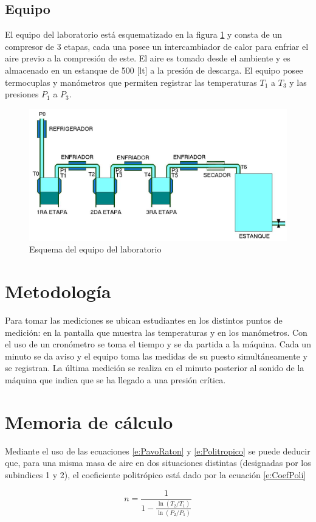 \documentclass[11pt,letterpaper]{extarticle}        %
\numberwithin{equation}{section}                    %
\begin{document}
\subsection{Equipo}
El equipo del laboratorio está esquematizado en la figura \ref{f:Equipo} y consta de un compresor de 3 etapas, cada una posee un intercambiador de calor para enfriar el aire previo a la compresión de este. El aire es tomado desde el ambiente y es almacenado en un estanque de 500 [lt] a la presión de descarga. El equipo posee termocuplas y manómetros que permiten registrar las temperaturas $T_1$ a $T_3$ y las presiones $P_1$ a $P_3$.

\begin{figure}[H]
\centering
\includegraphics[width = 0.7\linewidth]{Equipo}
\caption{Esquema del equipo del laboratorio}
\label{f:Equipo}
\end{figure}
\section{Metodología}
Para tomar las mediciones se ubican estudiantes en los distintos puntos de medición: en la pantalla que muestra las temperaturas y en los manómetros. Con el uso de un cronómetro se toma el tiempo y se da partida a la máquina. Cada un minuto se da aviso y el equipo toma las medidas de su puesto simultáneamente y se registran. La última medición se realiza en el minuto posterior al sonido de la máquina que indica que se ha llegado a una presión crítica.

\section{Memoria de cálculo}
Mediante el uso de las ecuaciones \ref{e:PavoRaton} y \ref{e:Politropico} se puede deducir que, para una misma masa de aire en dos situaciones distintas (designadas por los subindices 1 y 2), el coeficiente politrópico está dado por la ecuación \ref{e:CoefPoli}

\begin{equation}
n = \frac{1}
{1-\frac{\ln(T_2/T_1)}{\ln(P_2/P_1)}}
\label{e:CoefPoli}
\end{equation}
\end{document}
